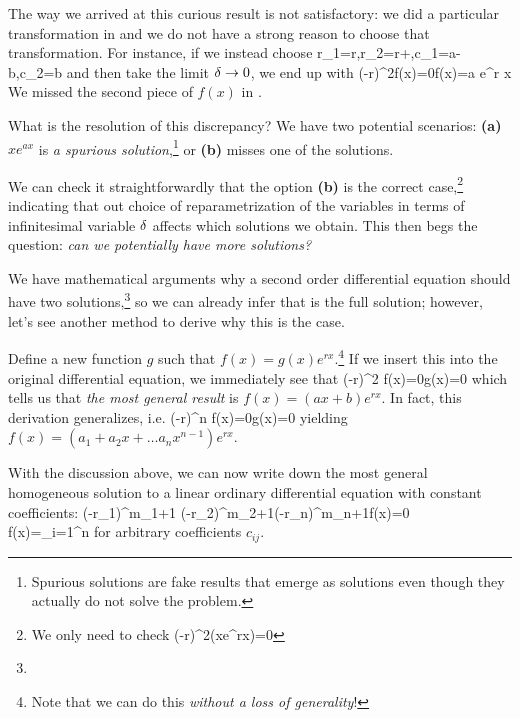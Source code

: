 The way we arrived at this curious result is not satisfactory: we did a particular transformation in  and we do not have a strong reason to choose that transformation. For instance, if we instead choose
\be 
\label{eq: repeated root transformation 2}
r_1=r\;,\quad r_2=r+\de\;,\quad c_1=a-b\;,\quad c_2=b
\ee 
and then take the limit $\delta\to0$, we end up with
\be 
\label{eq: repeated result 2}
\left(-r\right)^2f(x)=0\quad{}\quad f(x)=a e^{r x}
\ee 
We missed the second piece of $f(x)$ in .

What is the resolution of this discrepancy? We have two potential scenarios: \textbf{(a)} $x e^{ax}$ is \emph{a spurious solution},\footnote{Spurious solutions are fake results that emerge as solutions even though they actually do not solve the problem.} or \textbf{(b)}  misses one of the solutions.

We can check it straightforwardly that the option \textbf{(b)} is the correct case,\footnote{
	We only need to check
	\be 
	\left(-r\right)^2(xe^{rx})=0
	\ee 
} indicating that out choice of reparametrization of the variables in terms of infinitesimal variable $\delta$ affects which solutions we obtain. This then begs the question: \emph{can we potentially have more solutions?}

We have mathematical arguments why a second order differential equation should have two solutions,\footnote{} so we can already infer that  is the full solution; however, let's see another method to derive why this is the case.

Define a new function $g$ such that $f(x)=g(x)e^{rx}$.\footnote{Note that we can do this \emph{without a loss of generality}!} If we insert this into the original differential equation, we immediately see that
\be 
\left(-r\right)^2 f(x)=0\quad{}\quad {}g(x)=0
\ee 
which tells us that \emph{the most general result} is $f(x)=(ax+b)e^{rx}$. In fact, this derivation generalizes, i.e.
\be 
\left(-r\right)^n f(x)=0\quad{}\quad {}g(x)=0
\ee
yielding $f(x)=(a_1+a_2 x+\dots a_n x^{n-1})e^{rx}$.

With the discussion above, we can now write down the most general homogeneous solution to a linear ordinary differential equation with constant coefficients:
\bea
\left(-r_1\right)^{m_1+1} \left(-r_2\right)^{m_2+1}\cdots \left(-r_n\right)^{m_n+1}f(x)=0\\
\Rightarrow\qquad f(x)=\sum\limits_{i=1}^n\left[\left(\sum\limits_{k=0}^m c_{ik} x^k\right)e^{r_i x}\right]
\eea 
for arbitrary coefficients $c_{ij}$.


